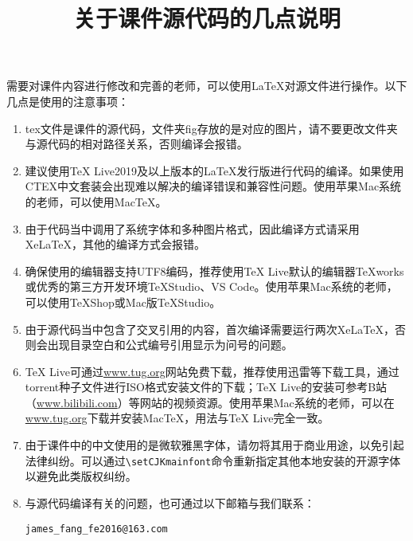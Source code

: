 \documentclass{ctexart}
\begin{document}
\fontsize{14}{16}\selectfont

\title{关于课件源代码的几点说明}
\date{}
\maketitle
\thispagestyle{empty}
需要对课件内容进行修改和完善的老师，可以使用\LaTeX{}对源文件进行操作。以下几点是使用的注意事项：
\begin{enumerate}
\item tex文件是课件的源代码，文件夹fig存放的是对应的图片，请不要更改文件夹与源代码的相对路径关系，否则编译会报错。
\item 	建议使用TeX Live2019及以上版本的\LaTeX{}发行版进行代码的编译。如果使用CTEX中文套装会出现难以解决的编译错误和兼容性问题。使用苹果Mac系统的老师，可以使用MacTeX。
\item 	由于代码当中调用了系统字体和多种图片格式，因此编译方式请采用Xe\LaTeX{}，其他的编译方式会报错。
\item 确保使用的编辑器支持UTF8编码，推荐使用TeX Live默认的编辑器TeXworks或优秀的第三方开发环境TeXStudio、VS Code。使用苹果Mac系统的老师，可以使用TeXShop或Mac版TeXStudio。
\item 	由于源代码当中包含了交叉引用的内容，首次编译需要运行两次Xe\LaTeX{}，否则会出现目录空白和公式编号引用显示为问号的问题。
\item 	TeX Live可通过\url{www.tug.org}网站免费下载，推荐使用迅雷等下载工具，通过torrent种子文件进行ISO格式安装文件的下载；TeX Live的安装可参考B站（\url{www.bilibili.com}）等网站的视频资源。使用苹果Mac系统的老师，可以在\url{www.tug.org}下载并安装MacTeX，用法与TeX Live完全一致。
\item 	由于课件中的中文使用的是微软雅黑字体，请勿将其用于商业用途，以免引起法律纠纷。可以通过\verb|\setCJKmainfont|命令重新指定其他本地安装的开源字体以避免此类版权纠纷。
\item 与源代码编译有关的问题，也可通过以下邮箱与我们联系：

\verb|james_fang_fe2016@163.com|
\end{enumerate}
\end{document}
